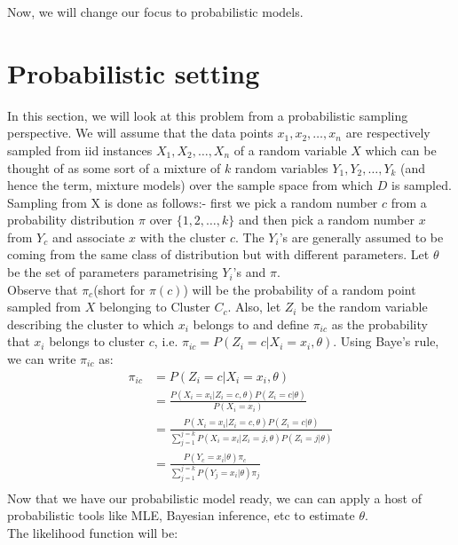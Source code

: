 \documentclass[12pt]{article}
\begin{document}
Now, we will change our focus to probabilistic models.

\section{Probabilistic setting}
In this section, we will look at this problem from a probabilistic sampling perspective. We will assume that the data points $x_1,x_2,\dots,x_n$ are respectively sampled from iid instances $X_1,X_2,\dots,X_n$ of a random variable $X$ which can be thought of as some sort of a mixture of $k$ random variables $Y_1,Y_2,\dots,Y_k$ (and hence the term, mixture models) over the sample space from which $D$ is sampled. Sampling from X is done as follows:- first we pick a random number $c$ from a probability distribution $\pi$ over $\{1,2,\dots,k\}$ and then pick a random number $x$ from $Y_c$ and associate $x$ with the cluster $c$. The $Y_i$'s are generally assumed to be coming from the same class of distribution but with different parameters. Let $\theta$ be the set of parameters parametrising $Y_i$'s and $\pi$.\\
Observe that $\pi_c$(short for $\pi(c)$) will be the probability of a random point sampled from $X$ belonging to Cluster $C_c$. Also, let $Z_i$ be the random variable describing the cluster to which $x_i$ belongs to and define $\pi_{ic}$ as the probability that $x_i$ belongs to cluster $c$, i.e. $\pi_{ic}= P(Z_i=c|X_i=x_i,\theta)$. Using Baye's rule, we can write $\pi_{ic}$ as:
\begin{equation}
\begin{split}
    \pi_{ic}&=P(Z_i=c|X_i=x_i,\theta)\\
            &=\frac{P(X_i=x_i|Z_i=c,\theta)P(Z_i=c|\theta)}{P(X_i=x_i)}\\
            &=\frac{P(X_i=x_i|Z_i=c,\theta)P(Z_i=c|\theta)}{\sum\limits_{j=1}^{j=k}P(X_i=x_i|Z_i=j,\theta)P(Z_i=j|\theta)}\\
            &=\frac{P(Y_c=x_i|\theta)\pi_c}{\sum\limits_{j=1}^{j=k}P(Y_j=x_i|\theta)\pi_j}\\
\end{split}
\end{equation}
Now that we have our probabilistic model ready, we can can apply a host of probabilistic tools like MLE, Bayesian inference, etc to estimate $\theta$.\\
The likelihood function will be:
\end{document}
